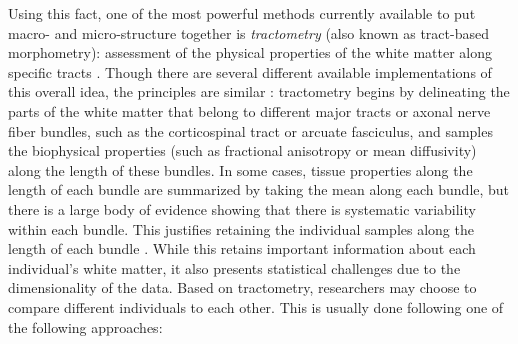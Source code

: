 Using this fact, one of the most powerful methods currently available to put
macro- and micro-structure together is \emph{tractometry} (also known as
tract-based morphometry): assessment of the physical properties of the white
matter along specific tracts \cite{Bells2011-cf}. Though there are several
different available implementations of this overall idea, the principles are
similar \cite{yeatman2012tract, Yendiki2011-ay, Wassermann2016-iv,
ODonnell2009-uu}: tractometry begins by delineating the parts of the white
matter that belong to different major tracts or axonal nerve fiber bundles, such
as the corticospinal tract or arcuate fasciculus, and samples the biophysical
properties (such as fractional anisotropy or mean diffusivity) along the length
of these bundles. In some cases, tissue properties along the length of each
bundle are summarized by taking the mean along each bundle, but there is a large
body of evidence showing that there is systematic variability within each
bundle. This justifies retaining the individual samples along the length of each
bundle \cite{yeatman2012tract, colby2012, ODonnell2009-uu}. While this retains
important information about each individual's white matter, it also presents
statistical challenges due to the dimensionality of the data. Based on
tractometry, researchers may choose to compare different individuals to each
other. This is usually done following one of the following approaches:

